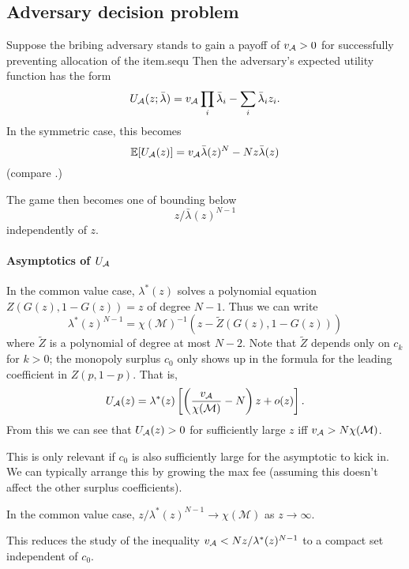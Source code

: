 
\newpage
\subsection{Adversary decision problem}

Suppose the bribing adversary stands to gain a payoff of $v_{\mathcal{A}}>0$ for successfully preventing allocation of the item.sequ
%
Then the adversary's expected utility function has the form
%
\[
  U_{\mathcal{A}}(z;\bar{\lambda}) = v_{\mathcal{A}}\prod_i\bar\lambda_i - \sum_i\bar\lambda_iz_i.
\]
%
In the symmetric case, this becomes 
\[ 
  \mathbb{E}[U_{\mathcal{A}}(z)] = v_{\mathcal{A}}\bar{\lambda}(z)^N - Nz\bar{\lambda}(z)
\]
(compare \cite[\S A.6]{FPR}.)

The game then becomes one of bounding below
\[
  z/\bar\lambda(z)^{N-1}
\]
independently of $z$.


\paragraph{Asymptotics of $U_{\mathcal{A}}$}
In the common value case, $\lambda^*(z)$ solves a polynomial equation $Z(G(z),1-G(z))=z$ of degree $N-1$.
%
Thus we can write
\[
  \lambda^*(z)^{N-1} = \chi(\mathcal{M})^{-1}\left( z - \tilde Z(G(z),1-G(z)) \right)
\]
where $\tilde Z$ is a polynomial of degree at most $N-2$.
%
Note that $\tilde Z$ depends only on $c_k$ for $k>0$; the monopoly surplus $c_0$ only shows up in the formula for the leading coefficient in $Z(p,1-p)$.
%
That is, 
\[
  U_{\mathcal{A}}(z) = \lambda^*(z)\left[ \left(\frac{v_{\mathcal{A}}}{\chi(\mathcal{M})} - N\right) z + o(z) \right].
\] 
From this we can see that $U_{\mathcal{A}}(z)>0$ for sufficiently large $z$ iff $v_{\mathcal{A}} > N\chi(\mathcal{M})$.

This is only relevant if $c_0$ is also sufficiently large for the asymptotic to kick in.
%
We can typically arrange this by growing the max fee (assuming this doesn't affect the other surplus coefficients).

\begin{lemma}

  In the common value case, $z/\lambda^*(z)^{N-1} \rightarrow \chi(\mathcal{M})$ as $z\rightarrow\infty$.

\end{lemma}

This reduces the study of the inequality $v_{\mathcal{A}} < N z/\lambda^*(z)^{N-1}$ to a compact set independent of $c_0$.

